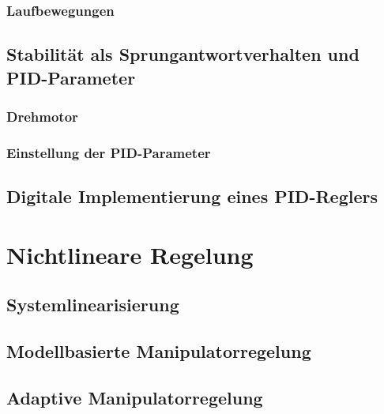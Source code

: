 \documentclass[a4paper, 11pt, accentcolor = tud3b]{tudreport}
\begin{document}
				\subsubsection{Laufbewegungen} %

			\subsection{Stabilität als Sprungantwortverhalten und PID-Parameter} %

				\subsubsection{Drehmotor} %

				\subsubsection{Einstellung der PID-Parameter} %

			\subsection{Digitale Implementierung eines PID-Reglers} %

		\section{Nichtlineare Regelung} %

			\subsection{Systemlinearisierung} %

			\subsection{Modellbasierte Manipulatorregelung} %

			\subsection{Adaptive Manipulatorregelung} %
\end{document}
